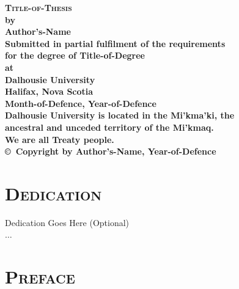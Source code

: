 \documentclass[12pt,letterpaper,oneside,titlepage,final]{dalthesis}
\numberwithin{equation}{section}
\newcommand{\ThesisAuthor}{Author's-Name}
\newcommand{\ThesisTitle}{Title-of-Thesis}
\newcommand{\ThesisDegree}{Title-of-Degree}%
\newcommand{\ThesisMonth}{Month-of-Defence}
\newcommand{\ThesisYear}{Year-of-Defence}
\newcommand{\ThesisUniversity}{Dalhousie University}
\newcommand{\ThesisLocation}{Halifax, Nova Scotia}
\newcommand{\ThesisLandAcknowledgement}{Dalhousie University is located in the Mi'kma'ki, the\\%
	                                     ancestral and unceded territory of the Mi'kmaq.\\%
	                                     We are all Treaty people.%
	                                     }
\newcommand{\skiplines}[1]{\vspace{#1\baselineskip}}
\begin{document}
 

\begin{titlepage}
\centering
\vspace*{\fill}
\textsc{\textbf{\large{\ThesisTitle}}}\\%
\skiplines{2}%
\textbf{
	{\!}by\\%
	\skiplines{2}%
	\ThesisAuthor\\%
	\skiplines{6}%
	Submitted in partial fulfilment of the requirements\\%
	for the degree of \ThesisDegree\\%
	\skiplines{2}%
	{\!}at\\%
	\skiplines{2}%
	\ThesisUniversity\\%
	\ThesisLocation\\%
	\ThesisMonth, \ThesisYear\\%
	\skiplines{2}%
	\ThesisLandAcknowledgement\\%
	\skiplines{4}%
	\copyright\ Copyright by \ThesisAuthor, \ThesisYear%
}
\vspace{\fill} %
\end{titlepage}


\chapter*{\centering\large\textsc{Dedication}} \setcounter{page}{2}
\vspace*{6cm}
\begin{center}
\large 
\noindent{}Dedication Goes Here (Optional)\\
\noindent{}$\mathbf{\dots}$\\
\end{center}
\clearpage





\chapter*{\centering\large\textsc{Preface}} 
\end{document}
